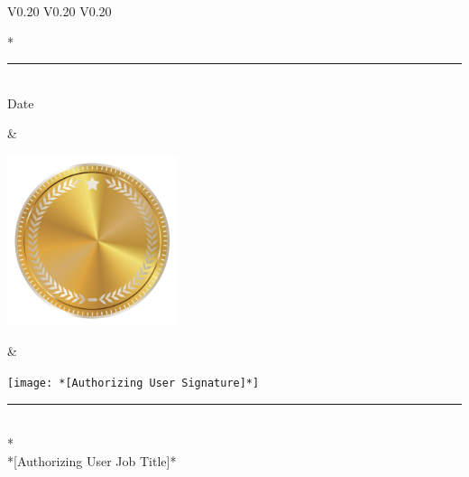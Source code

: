 \documentclass{article}
\begin{document}
\setlength{\tabcolsep}{12pt}
\begin{table}[h]
  \centering
  \begin{tabular} {V{0.20\paperwidth} V{0.20\paperwidth} V{0.20\paperwidth} }       
    \vspace{0pt}\parbox[b][1cm][b]{5cm}{\huge\selectfont {}* \\
    \rule{5cm}{0.4pt} \\
    \normalsize\selectfont \centering Date \\
    \phantom{Date}}                                                            &   
    \vspace{0pt}\parbox[b][1cm][c]{5cm}{\includegraphics[width=5cm]{images/goldseal}} &   
    \vspace{0pt}\parbox[b][1cm][b]{5cm}{\texttt{[image: *[Authorizing User Signature]*]} \\
    \rule{5cm}{0.4pt} \\
    \normalsize\selectfont {}* \\
    *[Authorizing User Job Title]*}
  \end{tabular}
\end{table}
\end{document}
